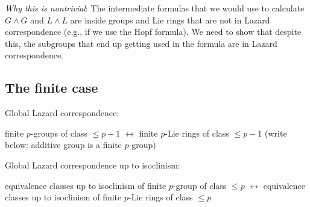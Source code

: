 \documentclass[10pt]{amsart}
\begin{document}
{\em Why this is nontrivial}: The intermediate formulas that we would
use to calculate $G \wedge G$ and $L \wedge L$ are inside groups and
Lie rings that are not in Lazard correspondence (e.g., if we use the
Hopf formula). We need to show that despite this, the subgroups that
end up getting used in the formula are in Lazard correspondence.

\subsection{The finite case}

Global Lazard correspondence:

finite $p$-groups of class $\le p - 1$ $\leftrightarrow$ finite
$p$-Lie rings of class $\le p - 1$ (write below: additive group is a
finite $p$-group)

Global Lazard correspondence up to isoclinism:

equivalence classes up to isoclinism of finite $p$-group of class $\le
p$ $\leftrightarrow$ equivalence classes up to isoclinism of finite
$p$-Lie rings of class $\le p$
\end{document}
